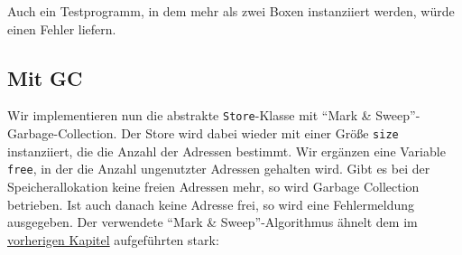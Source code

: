 \documentclass[]{article}
\begin{document}
Auch ein Testprogramm, in dem mehr als zwei Boxen instanziiert werden,
würde einen Fehler liefern.

\hypertarget{mit-gc}{%
\subsection{Mit GC}\label{mit-gc}}

Wir implementieren nun die abstrakte \texttt{Store}-Klasse mit ``Mark \&
Sweep''-Garbage-Collection. Der Store wird dabei wieder mit einer Größe
\texttt{size} instanziiert, die die Anzahl der Adressen bestimmt. Wir
ergänzen eine Variable \texttt{free}, in der die Anzahl ungenutzter
Adressen gehalten wird. Gibt es bei der Speicherallokation keine freien
Adressen mehr, so wird Garbage Collection betrieben. Ist auch danach
keine Adresse frei, so wird eine Fehlermeldung ausgegeben. Der
verwendete ``Mark \& Sweep''-Algorithmus ähnelt dem im
\protect\hyperlink{mark-and-sweep}{vorherigen Kapitel} aufgeführten
stark:
\end{document}
